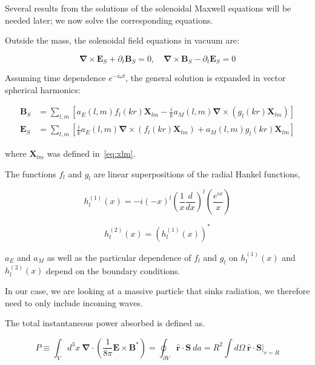 \documentclass {article}
\renewcommand\vec{\mathbf}
\let\OldS\nabla
\renewcommand{\nabla}{\boldsymbol{\OldS}}
\let\OldHat\hat
\renewcommand{\hat}[1]{\OldHat{\mathbf{#1}}}
\begin{document}
Several results from the solutions of the solenoidal Maxwell equations will be needed later; we now solve the corresponding equations.

Outside the mass, the solenoidal field equations in vacuum are:

\begin{equation}
\nabla \times \vec{E}_S + \partial_t \vec{B}_S = 0, \quad 
\nabla \times \vec{B}_S - \partial_t \vec{E}_S = 0
\end{equation}

Assuming time dependence \( e^{-i \omega t} \), the general solution is expanded in vector spherical harmonics:

\begin{equation}
\begin{aligned}
\vec{B}_S &= \sum_{l,m} \left[
a_E(l,m) f_l(kr) \vec{X}_{lm}
- \frac{i}{k} a_M(l,m) \nabla \times \left( g_l(kr) \vec{X}_{lm} \right)
\right] \\
\vec{E}_S &= \sum_{l,m} \left[
\frac{i}{k} a_E(l,m) \nabla \times \left( f_l(kr) \vec{X}_{lm} \right)
+ a_M(l,m) g_l(kr) \vec{X}_{lm}
\right]
\end{aligned}
\end{equation}

where \(\vec{X}_{lm}\) was defined in~\eqref{eq:xlm}.



The functions $f_l$ and $g_l$ are linear superpositions of the radial Hankel functions,

\begin{equation}
h_l^{(1)}(x) = -i (-x)^l \left(\frac 1 x \frac d {dx} \right)^l \left(\frac {e^{ix}} x \right)
\end{equation}

\begin{equation}
h_l^{(2)}(x) = \left( h_l^{(1)}(x) \right)^*
\end{equation}

\noindent $a_E$ and $a_M$ as well as the particular dependence of $f_l$ and $g_l$ on $h_l^{(1)}(x) $ and $h_l^{(2)}(x) $ depend on the boundary conditions.

In our case, we are looking at a massive particle that sinks radiation, we therefore need to only include incoming waves.

The total instantaneous power absorbed is defined as.

\begin{equation}
P \equiv \int_V d^3x ~ \nabla \cdot \left( \frac 1 {8 \pi} \vec E \times \vec B^*\right) = \oint_{\partial V} \hat r \cdot \vec S ~ da = R^2 \int d\Omega ~ \hat r \cdot \vec S \bigg|_{r = R}
\end{equation}
\end{document}
